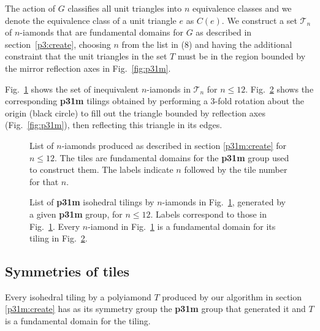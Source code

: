 \documentclass{ws-ijcga}
\begin{document}
The action of $G$ classifies all unit triangles into $n$ equivalence classes 
and we denote the equivalence class of a unit triangle $e$ as $C(e)$. 
We construct a set $\mathscr{T}_n$ of $n$-iamonds
that are
fundamental domains for $G$ as described in section~\ref{p3:create}, 
choosing $n$ from the list in (8) and
having the additional constraint that the unit triangles in the set $T$ 
must be in the region bounded by the mirror reflection axes in Fig.~\ref{fig:p31m}.

Fig.~\ref{p31mfighi} shows the set of inequivalent $n$-iamonds in $\mathscr{T}_n$  for $n \le 12$.  
Fig.~\ref{p31mtiling} shows the corresponding {\bf p31m} tilings obtained 
by performing a 3-fold rotation about the origin (black circle) to fill out 
the triangle bounded by reflection axes (Fig.~\ref{fig:p31m}), 
then reflecting this triangle in its edges.
\begin{figure}[h]
\centerline{
}
\vspace*{8pt}
\caption{
List of $n$-iamonds produced as described in section \ref{p31m:create} for $n \le 12$. 
The tiles are fundamental domains for the {\bf p31m} group used to construct them. 
The labels indicate $n$ followed by the tile number for that $n$. 
\label{p31mfighi}
}
\end{figure}
\begin{figure}\centerline{
}
\vspace*{8pt}
\caption{
List of {\bf p31m} isohedral tilings by $n$-iamonds in Fig.~\ref{p31mfighi}, 
generated by a given {\bf p31m} group, for $n \le 12$.
Labels correspond to those in Fig.~\ref{p31mfighi}. 
Every $n$-iamond in Fig.~\ref{p31mfighi} is a fundamental domain for its tiling in Fig.~\ref{p31mtiling}.
\label{p31mtiling}
    }
\end{figure}




\subsection{Symmetries of tiles}

\begin{theorem}
Every isohedral tiling by a polyiamond $T$ produced by our algorithm in section \ref{p31m:create}
has as its symmetry group the {\bf p31m} group that generated it and $T$ is a fundamental domain for
the tiling.
\end{theorem}
\end{document}
